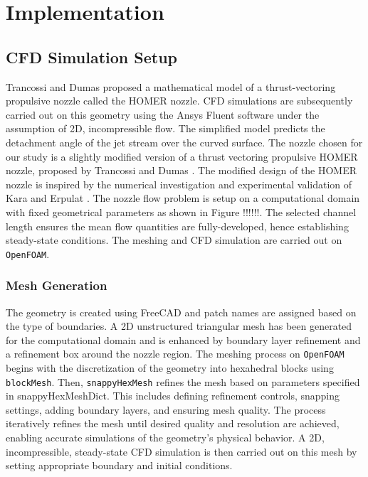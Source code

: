 \chapter{Implementation}
\label{chap:Method}
\section{CFD Simulation Setup}
Trancossi and Dumas \cite{trandum} proposed a mathematical model of a thrust-vectoring propulsive nozzle called the HOMER nozzle. CFD simulations are subsequently carried out on this geometry using the Ansys Fluent software under the assumption of 2D, incompressible flow. The simplified model predicts the detachment angle of the jet stream over the curved surface. The nozzle chosen for our study is a slightly modified version of a thrust vectoring propulsive HOMER nozzle, proposed by Trancossi and Dumas \cite{trandum}. The modified design of the HOMER nozzle is inspired by the numerical investigation and experimental validation of Kara and Erpulat \cite{kara}. The nozzle flow problem is setup on a computational domain with fixed geometrical parameters as shown in Figure !!!!!!. The selected channel length ensures the mean flow quantities are fully-developed, hence establishing steady-state conditions. The meshing and CFD simulation are carried out on \verb|OpenFOAM|. 
\subsection{Mesh Generation}
The geometry is created using FreeCAD and patch names are assigned based on the type of boundaries. A 2D unstructured triangular mesh has been generated for the computational domain and is enhanced by boundary layer refinement and a refinement box around the nozzle region. The meshing process on \verb|OpenFOAM| begins with the discretization of the geometry into hexahedral blocks using \verb|blockMesh|. Then, \verb|snappyHexMesh| refines the mesh based on parameters specified in snappyHexMeshDict. This includes defining refinement controls, snapping settings, adding boundary layers, and ensuring mesh quality. The process iteratively refines the mesh until desired quality and resolution are achieved, enabling accurate simulations of the geometry's physical behavior. A 2D, incompressible, steady-state CFD simulation is then carried out on this mesh by setting appropriate boundary and initial conditions.
